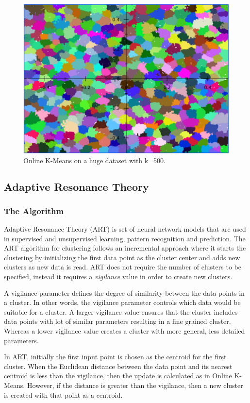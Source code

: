 \documentclass{lmproj}
\begin{document}
\begin{figure}[ht]
	\centering
	\includegraphics[width=0.6\linewidth]{onlinekm.png}
   \caption[BatchKM]{Online K-Means on a huge dataset with k=500.}
\end{figure}

\subsection{Adaptive Resonance Theory}
\subsubsection{The Algorithm}
Adaptive Resonance Theory (ART) \cite{ART} is set of neural network models that are used in supervised and unsupervised learning, pattern recognition and prediction. The ART algorithm for clustering follows an incremental approach where it starts the clustering by initializing the first data point as the cluster center and adds new clusters as new data is read. ART does not require the number of clusters to be specified, instead it requires a \textit{vigilance} value in order to create new clusters.

A vigilance parameter defines the degree of similarity between the data points in a cluster. In other words, the vigilance parameter controls which data would be suitable for a cluster. A larger vigilance value ensures that the cluster includes data points with lot of similar parameters resulting in a fine grained cluster. Whereas a lower vigilance value creates a cluster with more general, less detailed parameters.

In ART, initially the first input point is chosen as the centroid for the first cluster. When the Euclidean distance between the data point and its nearest centroid is less than the vigilance, then the update is calculated as in Online K-Means. However, if the distance is greater than the vigilance, then a new cluster is created with that point as a centroid.
\end{document}
